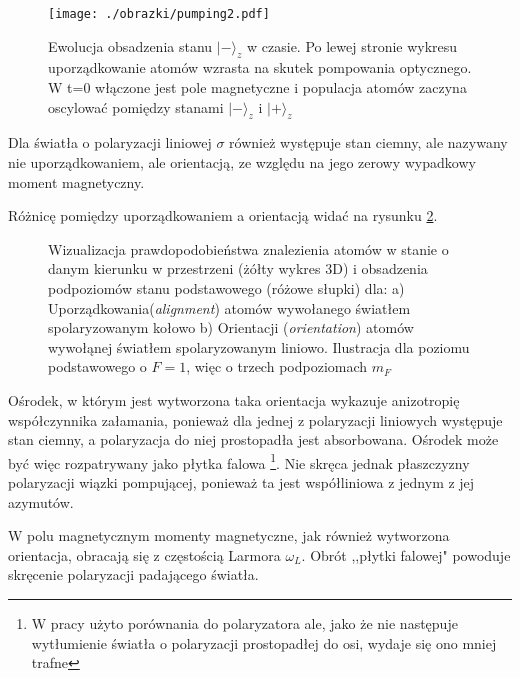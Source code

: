 \documentclass[a4paper,10pt,twoside]{article}
\begin{document}
\begin{figure}[h!]
\begin{center}
 \texttt{[image: ./obrazki/pumping2.pdf]}
\end{center}
\caption{ Ewolucja obsadzenia stanu $\lvert - \rangle_z$ w czasie. Po lewej stronie wykresu uporządkowanie atomów wzrasta na skutek pompowania optycznego. W t=0 włączone jest pole magnetyczne i populacja atomów zaczyna oscylować pomiędzy stanami $\lvert - \rangle_z$ i $\lvert + \rangle_z$ }
\label{fig:Px-}
\end{figure}



Dla światła o polaryzacji liniowej $\sigma$ również występuje stan ciemny, ale nazywany nie uporządkowaniem, ale orientacją, ze względu na jego zerowy wypadkowy moment magnetyczny.

Różnicę pomiędzy uporządkowaniem a orientacją widać na rysunku \ref{alor}.

\begin{figure}[h!]

\caption{Wizualizacja prawdopodobieństwa znalezienia atomów w stanie o danym kierunku w przestrzeni (żółty wykres 3D) i obsadzenia podpoziomów stanu podstawowego (różowe słupki) dla: a) Uporządkowania(\textit{alignment}) atomów wywołanego światłem spolaryzowanym kołowo b) Orientacji (\textit{orientation}) atomów wywołąnej światłem spolaryzowanym liniowo. Ilustracja dla poziomu podstawowego o $F=1$, więc o trzech podpoziomach $m_F$}
\label{alor}
\end{figure}

Ośrodek, w którym jest wytworzona taka orientacja wykazuje anizotropię współczynnika załamania, ponieważ dla jednej z polaryzacji liniowych występuje stan ciemny, a polaryzacja do niej prostopadła jest absorbowana. Ośrodek może być więc rozpatrywany jako płytka falowa \footnote{W pracy \cite{rotpol} użyto porównania do polaryzatora ale, jako że nie następuje wytłumienie światła o polaryzacji prostopadłej do osi, wydaje się ono mniej trafne}.  Nie skręca jednak płaszczyzny polaryzacji wiązki pompującej, ponieważ ta jest współliniowa z jednym z jej azymutów.

W polu magnetycznym momenty magnetyczne, jak również wytworzona orientacja, obracają się z częstością Larmora $\omega_L$. Obrót ,,płytki falowej" powoduje skręcenie polaryzacji padającego światła.
\end{document}
